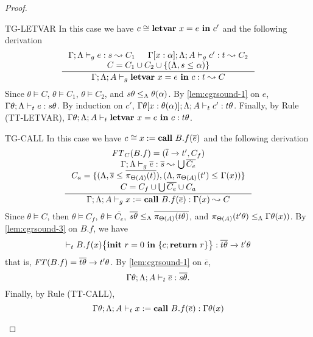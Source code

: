 {{{\begin{proof}
\begin{ProofEnumDesc}
\item[TG-LETVAR] In this case we have $c \cong  \lcLETVAR{x}{e}{c'} $ and the following derivation
\begin{equation*}
\inference
{\Gamma;\trace \vdash_{g} e : s \leadsto C_1&
\Gamma[x:\alpha]; \trace; A \vdash_{g} c' : t \leadsto C_2 \\
C = C_1\cup C_2 \cup \{(\trace, s \leq_{} \alpha) \}
}
{\Gamma;\trace; A\vdash_{g} \lcLETVAR{x}{e}{c} :  t\leadsto C}
\end{equation*}
Since $\theta \vDash C$, $\theta \vDash C_1$, $\theta\vDash C_2$, and $s\theta \leq_{\trace} \theta(\alpha)$.
By \ref{lem:cgrsound-1} on $e$, $\Gamma\theta;\trace \vdash_{t} e : s \theta $.
By induction on $c'$,  $\Gamma\theta[x:\theta(\alpha)]; \trace; A \vdash_{t} c' : t\theta$.
Finally, by Rule {(TT-LETVAR)}, $\Gamma\theta; \trace; A \vdash_{t} \lcLETVAR{x}{e}{c}: t\theta $.

\item[TG-CALL] In this case we have $c \cong  \lcCALL{x}{B.f}{\overline{e}} $ and the following derivation
\begin{equation*}
\inference
{
\FT_{C}(B.f) = (\overline{t} \xrightarrow{} t', C_{f})  \\
\Gamma;\trace \vdash_{g} \overline{e} : \overline{s} \leadsto \bigcup \overline{C_{e}} \\
C_{a} = \{(\trace, \overline{s}\leq_{} \overline{\app{t}{\Theta(A)}}), (\trace, \app{t'}{\Theta(A)}\leq_{} \Gamma(x))\} \\
C = C_{f} \cup \bigcup\overline{C_{e}}\cup C_{a}
}
{
\Gamma;\trace; A \vdash_{g} \lcCALL{x}{B.f}{\overline{e}} : \Gamma(x)\leadsto C
}
\end{equation*}
Since $\theta \vDash C$, then $\theta \vDash C_{f}$, $\theta\vDash \overline{C_{e}}$,
$\overline{s\theta}\leq_{\trace} \overline{\app{t\theta}{\Theta(A)}}$,
and $\app{t'\theta}{\Theta(A)}\leq_{\trace} \Gamma\theta(x))$.
By \ref{lem:cgrsound-3} on $B.f$,  we have
$$
\vdash_{t} \lpPROG{B.f}{x}{c}{\lpRES} :  \overline{t\theta}\xrightarrow{} t'\theta
$$
that is, $\FT(B.f) =  \overline{t\theta}\xrightarrow{} t'\theta$.
By \ref{lem:cgrsound-1} on $\overline{e}$,
$$\Gamma\theta;\trace; A \vdash_{t} \overline{e} : \overline{s\theta}.$$
Finally, by Rule  {(TT-CALL)},
$$
\Gamma\theta;\trace; A \vdash_{t} \lcCALL{x}{B.f}{\overline{e}} : \Gamma\theta(x)
$$


\end{ProofEnumDesc}
\end{proof}}}}
